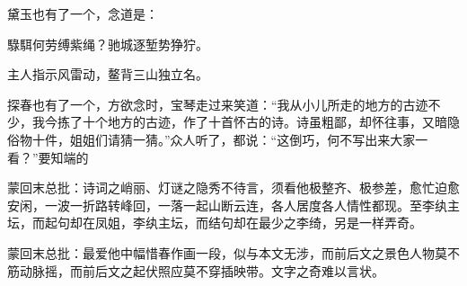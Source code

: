 \begin{parag}
    黛玉也有了一个，念道是：
\end{parag}


\begin{poem}
    \begin{pl}

        騄駬何劳缚紫绳？驰城逐堑势狰狞。
    \end{pl}
    \begin{pl}

        主人指示风雷动，鳌背三山独立名。
    \end{pl}

\end{poem}


\begin{parag}
    探春也有了一个，方欲念时，宝琴走过来笑道：“我从小儿所走的地方的古迹不少，我今拣了十个地方的古迹，作了十首怀古的诗。诗虽粗鄙，却怀往事，又暗隐俗物十件，姐姐们请猜一猜。”众人听了，都说：“这倒巧，何不写出来大家一看？”要知端的
\end{parag}


\begin{parag}
    \begin{note}蒙回末总批：诗词之峭丽、灯谜之隐秀不待言，须看他极整齐、极参差，愈忙迫愈安闲，一波一折路转峰回，一落一起山断云连，各人居度各人情性都现。至李纨主坛，而起句却在凤姐，李纨主坛，而结句却在最少之李绮，另是一样弄奇。\end{note}
\end{parag}


\begin{parag}
    \begin{note}蒙回末总批：最爱他中幅惜春作画一段，似与本文无涉，而前后文之景色人物莫不筋动脉摇，而前后文之起伏照应莫不穿插映带。文字之奇难以言状。\end{note}
\end{parag}

